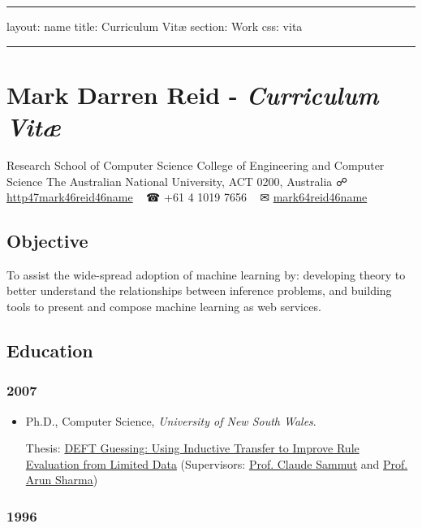 \documentclass{article}
\begin{document}
 

\vspace{.5em} \hrule \vspace{.5em}
layout: name title: Curriculum Vitæ section: Work css: vita


\vspace{.5em} \hrule \vspace{.5em}
\hypertarget{mark_darren_reid__curriculum_vit}{}\section*{{Mark Darren Reid - \emph{Curriculum Vitæ}}}\label{mark_darren_reid__curriculum_vit}

\href{/files/vita.pdf}{}

Research School of Computer Science \newline College of Engineering and Computer Science \newline The Australian National University, ACT 0200, Australia \newline ☍ \href{http://mark.reid.name}{http\char47mark\char46reid\char46name} ~{} ☎ +61 4 1019 7656 ~{} ✉ \href{mailto:mark@reid.name}{mark\char64reid\char46name}

\hypertarget{objective}{}\subsection*{{Objective}}\label{objective}

To assist the wide-spread adoption of machine learning by: developing theory to better understand the relationships between inference problems, and building tools to present and compose machine learning as web services.

\hypertarget{education}{}\subsection*{{Education}}\label{education}

\hypertarget{2007}{}\subsubsection*{{2007}}\label{2007}

\begin{itemize}%
\item Ph.D., Computer Science, \emph{University of New South Wales}.

Thesis: \href{http://mark.reid.name/files/pubs/unsw07.pdf}{DEFT Guessing: Using Inductive Transfer to Improve Rule Evaluation from Limited Data} (Supervisors: \href{http://www.cse.unsw.edu.au/~claude/}{Prof. Claude Sammut} and \href{http://staff.qut.edu.au/staff/sharmaak/}{Prof. Arun Sharma})



\end{itemize}
\hypertarget{1996}{}\subsubsection*{{1996}}\label{1996}
\end{document}
